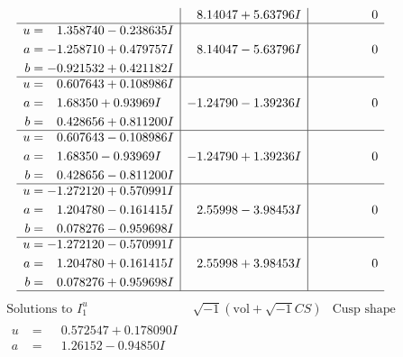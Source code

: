 \documentclass[1p]{elsarticle_modified}
\theoremstyle{definition}
\newcommand{\I}{\sqrt{-1}}
\begin{document}
$$\begin{array}{c|c|c}
 & \phantom{-}8.14047 + 5.63796 I & \phantom{-0.000000 } 0 \\ \hline\begin{aligned}
u &= \phantom{-}1.358740 - 0.238635 I \\
a &= -1.258710 + 0.479757 I \\
b &= -0.921532 + 0.421182 I\end{aligned}
 & \phantom{-}8.14047 - 5.63796 I & \phantom{-0.000000 } 0 \\ \hline\begin{aligned}
u &= \phantom{-}0.607643 + 0.108986 I \\
a &= \phantom{-}1.68350 + 0.93969 I \\
b &= \phantom{-}0.428656 + 0.811200 I\end{aligned}
 & -1.24790 - 1.39236 I & \phantom{-0.000000 } 0 \\ \hline\begin{aligned}
u &= \phantom{-}0.607643 - 0.108986 I \\
a &= \phantom{-}1.68350 - 0.93969 I \\
b &= \phantom{-}0.428656 - 0.811200 I\end{aligned}
 & -1.24790 + 1.39236 I & \phantom{-0.000000 } 0 \\ \hline\begin{aligned}
u &= -1.272120 + 0.570991 I \\
a &= \phantom{-}1.204780 - 0.161415 I \\
b &= \phantom{-}0.078276 - 0.959698 I\end{aligned}
 & \phantom{-}2.55998 - 3.98453 I & \phantom{-0.000000 } 0 \\ \hline\begin{aligned}
u &= -1.272120 - 0.570991 I \\
a &= \phantom{-}1.204780 + 0.161415 I \\
b &= \phantom{-}0.078276 + 0.959698 I\end{aligned}
 & \phantom{-}2.55998 + 3.98453 I & \phantom{-0.000000 } 0\\
 \hline 
 \end{array}$$\newpage$$\begin{array}{c|c|c}  
\text{Solutions to }I^u_{1}& \I (\text{vol} + \sqrt{-1}CS) & \text{Cusp shape}\\
 \hline 
\begin{aligned}
u &= \phantom{-}0.572547 + 0.178090 I \\
a &= \phantom{-}1.26152 - 0.94850 I \\

\end{aligned}
\end{array}$$
\end{document}

